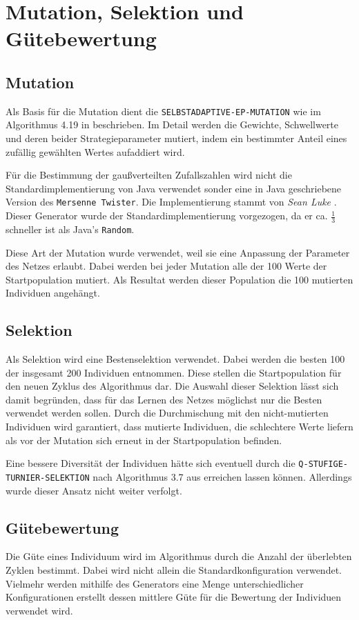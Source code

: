 \chapter{Mutation, Selektion und Gütebewertung}

\section{Mutation}
Als Basis für die Mutation dient die \verb+SELBSTADAPTIVE-EP-MUTATION+ wie im Algorithmus 4.19 in \cite{Weicker200709} beschrieben. Im Detail werden die Gewichte, Schwellwerte und deren beider Strategieparameter mutiert, indem ein bestimmter Anteil eines zufällig gewählten Wertes aufaddiert wird. 

Für die Bestimmung der gaußverteilten Zufallszahlen wird nicht die Standardimplementierung von Java verwendet sonder eine in Java geschriebene Version des \verb+Mersenne Twister+. Die Implementierung stammt von \textit{Sean Luke} \cite{mersenne}. Dieser Generator wurde der Standardimplementierung vorgezogen, da er ca. $ \frac{1}{3} $ schneller ist als Java's \verb+Random+.

Diese Art der Mutation wurde verwendet, weil sie eine Anpassung der Parameter des Netzes erlaubt. Dabei werden bei jeder Mutation alle der 100 Werte der Startpopulation mutiert. Als Resultat werden dieser Population die 100 mutierten Individuen angehängt.

\section{Selektion}
Als Selektion wird eine Bestenselektion verwendet. Dabei werden die besten 100 der insgesamt 200 Individuen entnommen. Diese stellen die Startpopulation für den neuen Zyklus des Algorithmus dar. Die Auswahl dieser Selektion lässt sich damit begründen, dass für das Lernen des Netzes möglichst nur die Besten verwendet werden sollen. Durch die Durchmischung mit den nicht-mutierten Individuen wird garantiert, dass mutierte Individuen, die schlechtere Werte liefern als vor der Mutation sich erneut in der Startpopulation befinden.

Eine bessere Diversität der Individuen hätte sich eventuell durch die \verb+Q-STUFIGE-TURNIER-SELEKTION+ nach Algorithmus 3.7 aus \cite{Weicker200709} erreichen lassen können. Allerdings wurde dieser Ansatz nicht weiter verfolgt.

\section{Gütebewertung}
Die Güte eines Individuum wird im Algorithmus durch die Anzahl der überlebten Zyklen bestimmt. Dabei wird nicht allein die Standardkonfiguration verwendet. Vielmehr werden mithilfe des Generators eine Menge unterschiedlicher Konfigurationen erstellt dessen mittlere Güte für die Bewertung der Individuen verwendet wird.